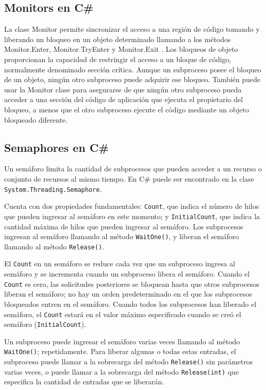 \documentclass[10pt]{article} %
\newcommand{\csl}[1]{\colorbox{backcolour}{\texttt{#1}}}
\begin{document}
\subsection{Monitors en C\#}

La clase Monitor permite sincronizar el acceso a una región de código tomando y liberando un bloqueo en un objeto determinado llamando a los métodos Monitor.Enter, Monitor.TryEnter y Monitor.Exit . Los bloqueos de objeto proporcionan la capacidad de restringir el acceso a un bloque de código, normalmente denominado sección crítica. Aunque un subproceso posee el bloqueo de un objeto, ningún otro subproceso puede adquirir ese bloqueo. También puede usar la Monitor clase para asegurarse de que ningún otro subproceso pueda acceder a una sección del código de aplicación que ejecuta el propietario del bloqueo, a menos que el otro subproceso ejecute el código mediante un objeto bloqueado diferente.

\subsection{Semaphores en C\#}

Un sem\'aforo limita la cantidad de subprocesos que pueden acceder a un recurso o conjunto de recursos al mismo tiempo. En C\# puede ser encontrado en la clase \csl{System.Threading.Semaphore}.

Cuenta con dos propiedades fundamentales: \csl{Count}, que indica el n\'umero de hilos que pueden ingresar al sem\'aforo en este momento; y \csl{InitialCount}, que indica la cantidad m\'axima de hilos que pueden ingresar al sem\'aforo. Los subprocesos ingresan al semáforo llamando al método \csl{WaitOne()}, y liberan el semáforo llamando al método \csl{Release()}.

El \csl{Count} en un semáforo se reduce cada vez que un subproceso ingresa al semáforo y se incrementa cuando un subproceso libera el semáforo. Cuando el \csl{Count} es cero, las solicitudes posteriores se bloquean hasta que otros subprocesos liberan el semáforo; no hay un orden predeterminado en el que los subprocesos bloqueados entren en el semáforo. Cuando todos los subprocesos han liberado el semáforo, el \csl{Count} estar\'a en el valor máximo especificado cuando se creó el semáforo (\csl{InitialCount}).

Un subproceso puede ingresar el semáforo varias veces llamando al método \csl{WaitOne()}; repetidamente. Para liberar algunas o todas estas entradas, el subproceso puede llamar a la sobrecarga del método \csl{Release()} sin parámetros varias veces, o puede llamar a la sobrecarga del método \csl{Release(int)} que especifica la cantidad de entradas que se liberarán.
\end{document}
